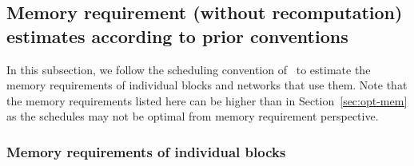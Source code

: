 \documentclass[10pt]{article}
\begin{document}
\subsection{Memory requirement (without recomputation) estimates according to prior conventions}
\label{sec:compute-opt}




In this subsection, we follow the scheduling convention
of~\citet{chowdhery2019visual} to estimate the memory requirements of
individual blocks and networks that use them. Note that the memory
requirements listed here can be higher than in
Section~\ref{sec:opt-mem} as the schedules may not be optimal from
memory requirement perspective.


\subsubsection{Memory requirements of individual blocks}
\end{document}
